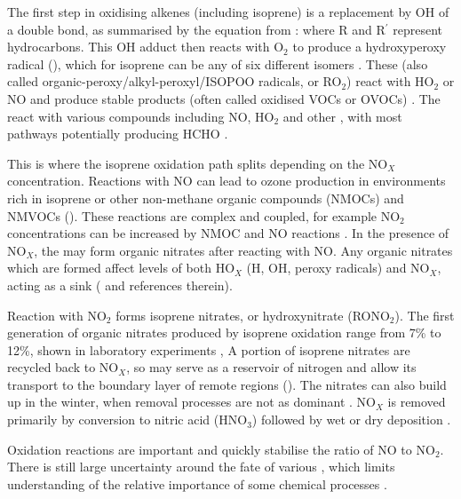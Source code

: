    
    The first step in oxidising alkenes (including isoprene) is a replacement by OH of a double bond, as summarised by the equation from \cite{Patchen2007}:
    where R and R$^{\prime}$ represent hydrocarbons.
    This OH adduct then reacts with O$_2$ to produce a hydroxyperoxy radical (\roo), which for isoprene can be any of six different isomers \citep{Patchen2007}.
    These \roo (also called organic-peroxy/alkyl-peroxyl/ISOPOO radicals, or RO$_2$)  react with HO$_2$ or NO and produce stable products (often called oxidised VOCs or OVOCs) \citep{Nguyen2014}.
    The \roo react with various compounds including NO, HO$_2$ and other \roo, with most pathways potentially producing HCHO \citep{Wolfe2016}.
    
    
    This is where the isoprene oxidation path splits depending on the NO$_X$ concentration.
    Reactions with NO can lead to ozone production in environments rich in isoprene or other non-methane organic compounds (NMOCs) and NMVOCs (\cite{Patchen2007,AtkinsonArey2003}).
    These reactions are complex and coupled, for example NO$_2$ concentrations can be increased by NMOC and NO reactions \citep{AtkinsonArey2003}.
    In the presence of NO$_X$, the \roo may form organic nitrates after reacting with NO.
    Any organic nitrates which are formed affect levels of both HO$_X$ (H, OH, peroxy radicals) and NO$_X$, acting as a sink (\cite{Mao2013} and references therein).
    
    Reaction with NO$_2$ forms isoprene nitrates, or hydroxynitrate (RONO$_2$).
    The first generation of organic nitrates produced by isoprene oxidation range from 7\% to 12\%, shown in laboratory experiments \citep{Paulot2009a, Mao2013},
    A portion of isoprene nitrates are recycled back to NO$_X$, so may serve as a reservoir of nitrogen and allow its transport to the boundary layer of remote regions (\cite{Patchen2007,Paulot2009a}).
    The nitrates can also build up in the winter, when removal processes are not as dominant \citep{Lelieveld2009}.
    NO$_X$ is removed primarily by conversion to nitric acid (HNO$_3$) followed by wet or dry deposition \citep{Ayers2006}.
    
    Oxidation reactions are important and quickly stabilise the ratio of NO to NO$_2$. 
    There is still large uncertainty around the fate of various \roo, which limits understanding of the relative importance of some chemical processes \citep{Crounse2013}.
    

